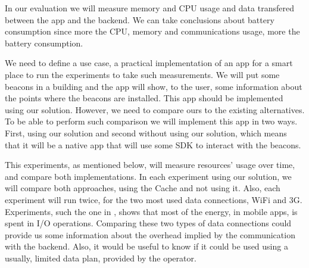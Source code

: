 In our evaluation we will measure memory and CPU usage
and data transfered between the app and the backend.
We can take conclusions about battery consumption since
more the CPU, memory and communications usage,
more the battery consumption.

We need to define a use case, a practical implementation
of an app for a smart place to run the experiments
to take such measurements. We will put some beacons
in a building and the app will show, to the user,
some information about the points where the beacons
are installed.
This app should be implemented using our solution.
However, we need to compare ours to the existing
alternatives. To be able to perform such comparison
we will implement this app in two ways.
First, using our solution and second without using
our solution, which means that it will be a native
app that will use some SDK to interact with the
beacons.

This experiments, as mentioned below, 
will measure resources' usage over time, 
and compare both implementations. In each
experiment using our solution, we will
compare both approaches, using the Cache
and not using it. Also, each experiment
will run twice, for the two most used
data connections, WiFi and 3G.
Experiments, such the one
in \cite{Pathak2012}, shows that most of the energy, 
in mobile apps,
is spent in I/O operations.
Comparing these
two types of data connections could provide us
some information about the
overhead implied by the communication with
the backend. Also, it would be useful to
know if it could be used using
a usually, limited data plan, provided by
the operator.

